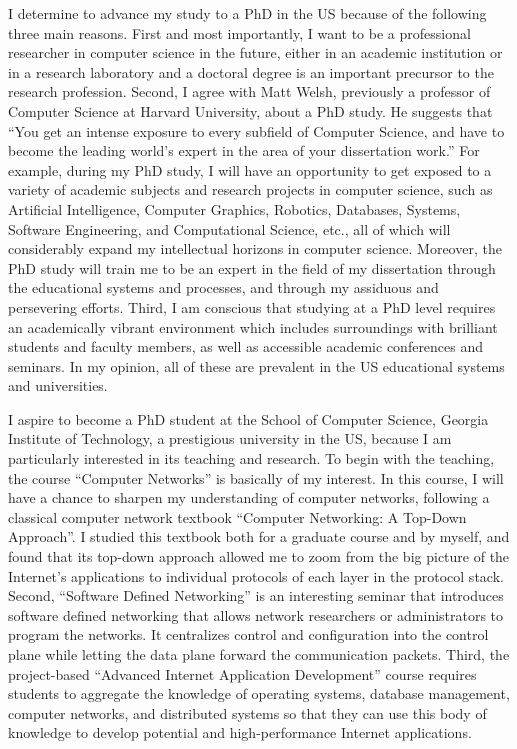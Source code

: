 \documentclass[a4paper,10pt]{report}
\newcommand{\university}{Georgia Institute of Technology}
\newcommand{\department}{School of Computer Science}
\begin{document}
\vspace{0.2cm}
I determine to advance my study to a PhD in the US because of the following three main reasons. First and most importantly, I want to be a professional researcher in computer science in the future, either in an academic institution or in a research laboratory and a doctoral degree is an important precursor to the research profession. Second, I agree with Matt Welsh, previously a professor of Computer Science at Harvard University, about a PhD study. He suggests that ``You get an intense exposure to every subfield of Computer Science, and have to become the leading world's expert in the area of your dissertation work.'' For example, during my PhD study, I will have an opportunity to get exposed to a variety of academic subjects and research projects in computer science, such as Artificial Intelligence, Computer Graphics, Robotics, Databases, Systems, Software Engineering, and Computational Science, etc., all of which will considerably expand my intellectual horizons in computer science. Moreover, the PhD study will train me to be an expert in the field of my dissertation through the educational systems and processes, and through my assiduous and persevering efforts. Third, I am conscious that studying at a PhD level requires an academically vibrant environment which includes surroundings with brilliant students and faculty members, as well as accessible academic conferences and seminars. In my opinion, all of these are prevalent in the US educational systems and universities.

\vspace{0.2cm}
I aspire to become a PhD student at the \department, \university, a prestigious university in the US, because I am particularly interested in its teaching and research. To begin with the teaching, the course ``Computer Networks'' is basically of my interest.  In this course, I will have a chance to sharpen my understanding of computer networks, following a classical computer network textbook ``Computer Networking: A Top-Down Approach''. I studied this textbook both for a graduate course and by myself, and found that its top-down approach allowed me to zoom from the big picture of the Internet's applications to individual protocols of each layer in the protocol stack. Second, ``Software Defined Networking'' is an interesting seminar that introduces software defined networking that allows network researchers or administrators to program the networks. It centralizes control and configuration into the control plane while letting the data plane forward the communication packets. Third, the project-based ``Advanced Internet Application Development'' course requires students to aggregate the knowledge of operating systems, database management, computer networks, and distributed systems so that they can use this body of knowledge to develop potential and high-performance Internet applications. 
\end{document}
